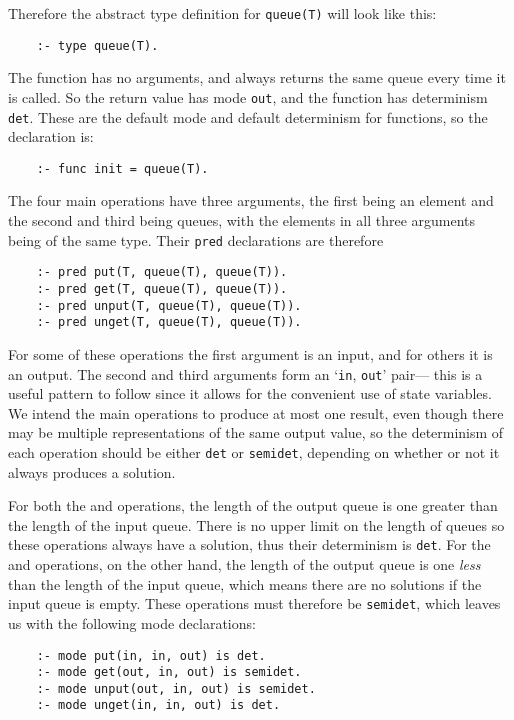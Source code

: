 Therefore the abstract type definition for \texttt{queue(T)}
will look like this:
\begin{verbatim}
    :- type queue(T).
\end{verbatim}

The  function has no arguments,
and always returns the same queue every time it is called.
So the return value has mode \texttt{out},
and the function has determinism \texttt{det}.
These are the default mode and default determinism for functions,
so the declaration is:
\begin{verbatim}
    :- func init = queue(T).
\end{verbatim}

The four main operations have three arguments,
the first being an element and the second and third being queues,
with the elements in all three arguments being of the same type.
Their \texttt{pred} declarations are therefore
\begin{verbatim}
    :- pred put(T, queue(T), queue(T)).
    :- pred get(T, queue(T), queue(T)).
    :- pred unput(T, queue(T), queue(T)).
    :- pred unget(T, queue(T), queue(T)).
\end{verbatim}
For some of these operations the first argument is an input,
and for others it is an output.
The second and third arguments
form an `\texttt{in}, \texttt{out}' pair---%
this is a useful pattern to follow
since it allows for the convenient use of state variables.
We intend the main operations to produce at most one result,
even though there may be
multiple representations of the same output value,
so the determinism of each operation
should be either \texttt{det} or \texttt{semidet},
depending on whether or not it always produces a solution.

For both the  and  operations,
the length of the output queue is one greater than
the length of the input queue.
There is no upper limit on the length of queues
so these operations always have a solution,
thus their determinism is \texttt{det}.
For the  and  operations,
on the other hand,
the length of the output queue is one \emph{less} than
the length of the input queue,
which means there are no solutions if the input queue is empty.
These operations must therefore be \texttt{semidet},
which leaves us with the following mode declarations:
\begin{verbatim}
    :- mode put(in, in, out) is det.
    :- mode get(out, in, out) is semidet.
    :- mode unput(out, in, out) is semidet.
    :- mode unget(in, in, out) is det.
\end{verbatim}

